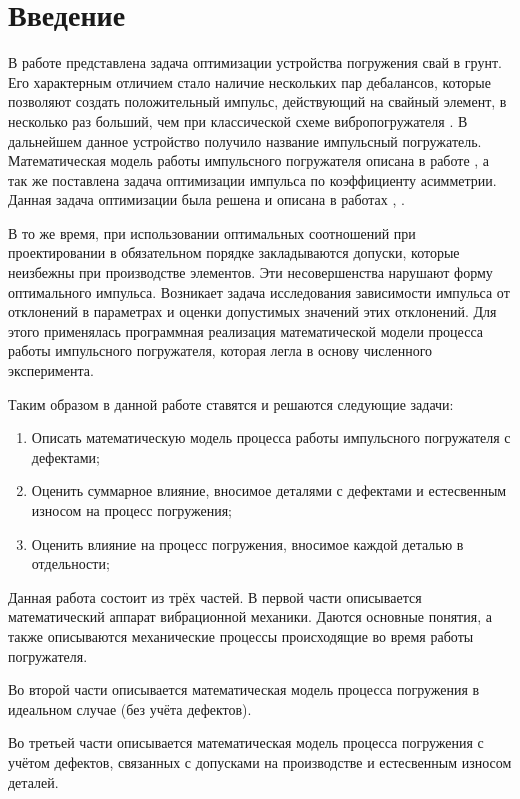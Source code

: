 \section*{Введение}

В работе \cite{ermolenko} представлена задача оптимизации устройства погружения свай в грунт. Его характерным отличием стало наличие
нескольких пар дебалансов, которые позволяют создать положительный импульс, действующий на свайный элемент, в несколько раз больший,
чем при классической схеме вибропогружателя \cite{ermolenko_patent}. В дальнейшем данное устройство получило название импульсный погружатель.
Математическая модель работы импульсного погружателя описана в работе \cite{ermolenko_kostin}, а так же поставлена задача оптимизации импульса по
коэффициенту асимметрии. Данная задача оптимизации была решена и описана в работах \cite{ermolenko_kostin}, \cite{kostin_va}.

В то же время, при использовании оптимальных соотношений при проектировании в обязательном порядке закладываются допуски,
которые неизбежны при производстве элементов. Эти несовершенства нарушают форму оптимального импульса. Возникает задача исследования
зависимости импульса от отклонений в параметрах и оценки допустимых значений этих отклонений. Для этого применялась программная реализация
математической модели процесса работы импульсного погружателя, которая легла в основу численного эксперимента.

Таким образом в данной работе ставятся и решаются следующие задачи:
\begin{enumerate}
    \item Описать математическую модель процесса работы импульсного погружателя с дефектами;
    \item Оценить суммарное влияние, вносимое деталями с дефектами и естесвенным износом на процесс погружения;
    \item Оценить влияние на процесс погружения, вносимое каждой деталью в отдельности;
\end{enumerate}

Данная работа состоит из трёх частей. В первой части описывается математический аппарат вибрационной механики.
Даются основные понятия, а также описываются механические процессы происходящие во время работы погружателя.

Во второй части описывается математическая модель процесса погружения в идеальном случае (без учёта дефектов).

Во третьей части описывается математическая модель процесса погружения с учётом дефектов, связанных с допусками
на производстве и естесвенным износом деталей.

